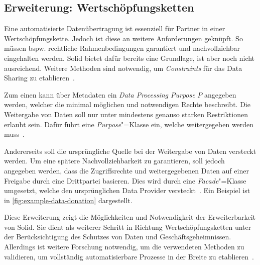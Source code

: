 \subsection{Erweiterung: Wertschöpfungsketten}

Eine automatisierte Datenübertragung ist essenziell für Partner in einer Wertschöpfungskette.
Jedoch ist diese an weitere Anforderungen geknüpft.
So müssen bspw. rechtliche Rahmenbedingungen garantiert und nachvollziehbar eingehalten werden.
Solid bietet dafür bereits eine Grundlage, ist aber noch nicht ausreichend.
Weitere Methoden sind notwendig, um \emph{Constraints} für das Data Sharing zu etablieren~\cite{bothSolidBasedB2BData2025}.

Zum einen kann über Metadaten ein \emph{Data Processing Purpose} $P$ angegeben werden, welcher die minimal möglichen und notwendigen Rechte beschreibt.
Die Weitergabe von Daten soll nur unter mindestens genauso starken Restriktionen erlaubt sein.
Dafür führt \cite{bothSolidBasedB2BData2025} eine \emph{Purpose}"=Klasse ein, welche weitergegeben werden muss~\cite{bothSolidBasedB2BData2025}.

Andererseits soll die ursprüngliche Quelle bei der Weitergabe von Daten versteckt werden.
Um eine spätere Nachvollziehbarkeit zu garantieren, soll jedoch angegeben werden, dass die Zugriffsrechte und weitergegebenen Daten auf einer Freigabe durch eine Drittpartei basieren.
Dies wird durch eine \emph{Facade}"=Klasse umgesetzt, welche den ursprünglichen Data Provider versteckt~\cite{bothSolidBasedB2BData2025}. Ein Beispiel ist in \autoref{fig:example-data-donation} dargestellt.

Diese Erweiterung zeigt die Möglichkeiten und Notwendigkeit der Erweiterbarkeit von Solid.
Sie dient als weiterer Schritt in Richtung Wertschöpfungsketten unter der Berücksichtigung des Schutzes von Daten und Geschäftsgeheimnissen.
Allerdings ist weitere Forschung notwendig, um die verwendeten Methoden zu validieren, um vollständig automatisierbare Prozesse in der Breite zu etablieren~\cite{bothSolidBasedB2BData2025}.
